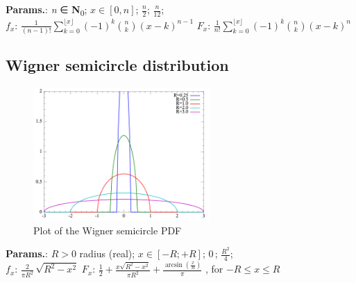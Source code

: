     {\color{darkblue} \textbf{Params.}:} {\textit{n} ∈ \textbf{N}\textsubscript{0}}; {$x \in [0,n]$}; {$\frac{n}{2}$}; {$\frac{n}{12}$};\hspace{0.5cm}\\{\color{darkblue} \textbf{$f_x$}:} {$\frac{1}{(n-1)!}\sum_{k=0}^{\lfloor x\rfloor}(-1)^k\binom{n}{k}(x-k)^{n-1}$}{\color{darkblue} \textbf{$F_x$}:} {$\frac{1}{n!}\sum_{k=0}^{\lfloor x\rfloor}(-1)^k\binom{n}{k}(x-k)^n$}



    
        
\subsection{Wigner semicircle distribution}


    \begin{figure}[H]
        \centering
        \includegraphics[width=0.6\textwidth]{images/WignerS distribution PDF.png}
        \caption{Plot of the Wigner semicircle PDF}
    \end{figure}




    {\color{darkblue} \textbf{Params.}:} {$R>0\!$ radius (real)}; {$x \in [-R;+R]\!$}; {$0\,$}; {$\frac{R^2}{4}\!$};\hspace{0.5cm}\\{\color{darkblue} \textbf{$f_x$}:} {$\frac2{\pi R^2}\,\sqrt{R^2-x^2}\!$}{\color{darkblue} \textbf{$F_x$}:} {$\frac12+\frac{x\sqrt{R^2-x^2}}{\pi R^2} + \frac{\arcsin\!\left(\frac{x}{R}\right)}{\pi}\!$ , for $-R\leq x \leq R$}



